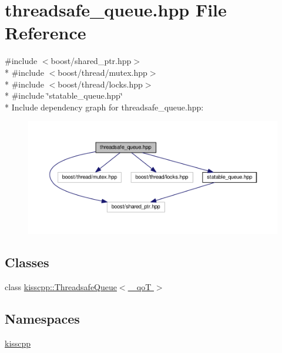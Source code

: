 \hypertarget{a00086}{\section{threadsafe\-\_\-queue.\-hpp File Reference}
\label{a00086}
}
{\ttfamily \#include $<$boost/shared\-\_\-ptr.\-hpp$>$}\\*
{\ttfamily \#include $<$boost/thread/mutex.\-hpp$>$}\\*
{\ttfamily \#include $<$boost/thread/locks.\-hpp$>$}\\*
{\ttfamily \#include \char`\"{}statable\-\_\-queue.\-hpp\char`\"{}}\\*
Include dependency graph for threadsafe\-\_\-queue.\-hpp\-:\nopagebreak
\begin{figure}[H]
\begin{center}
\leavevmode
\includegraphics[width=350pt]{a00136}
\end{center}
\end{figure}
\subsection*{Classes}
\begin{DoxyCompactItemize}
\item 
class \hyperlink{a00046}{kisscpp\-::\-Threadsafe\-Queue$<$ \-\_\-qo\-T $>$}
\end{DoxyCompactItemize}
\subsection*{Namespaces}
\begin{DoxyCompactItemize}
\item 
\hyperlink{a00089}{kisscpp}
\end{DoxyCompactItemize}
